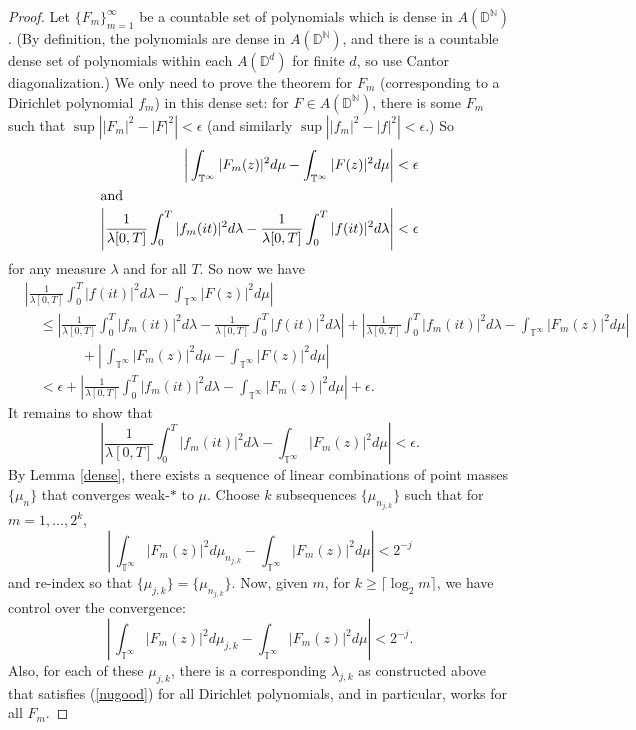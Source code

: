 \documentclass[]{elsarticle}
\newcommand{\N}{\mathbb{N}}
\newcommand{\T}{\mathbb{T}}
\newcommand{\D}{\mathbb{D}}
\numberwithin{equation}{section}
\begin{document}
    \begin{proof}
      Let $\{F_m\}_{m=1}^{\infty}$ be a countable set of polynomials which is dense in $A(\D^\N)$. (By definition, the polynomials are dense in $A(\D^\N)$, and there is a countable dense set of polynomials within each $A(\D^d)$ for finite $d$, so use Cantor diagonalization.) We only need to prove the theorem for $F_m$ (corresponding to a Dirichlet polynomial $f_m$) in this dense set: for $F\in A(\D^\N)$, there is some $F_m$ such that $\sup\left||F_m|^2-|F|^2\right|<\epsilon$ (and similarly $\sup\left||f_m|^2-|f|^2\right|<\epsilon$.) So 
      \begin{align*}
        \left|\,\int_{\T^{\infty}}|F_m(z)|^2d\mu -\int_{\T^{\infty}}|F(z)|^2d\mu \right| &< \epsilon\\
        \intertext{and}
        \left|\frac{1}{\lambda[0,T]}\int_{0}^{T}|f_m(it)|^2d\lambda - \frac{1}{\lambda[0,T]}\int_{0}^{T}|f(it)|^2d\lambda\right| &< \epsilon
      \end{align*}
      for any measure $\lambda$ and for all $T$. So now we have
      \begin{align*}
        &\left|\frac{1}{\lambda[0,T]}\int_{0}^{T}|f(it)|^2d\lambda -\int_{\T^{\infty}}|F(z)|^2d\mu\right|\\
          &\quad\leq \left|\frac{1}{\lambda[0,T]}\int_{0}^{T}|f_m(it)|^2d\lambda - \frac{1}{\lambda[0,T]}\int_{0}^{T}|f(it)|^2d\lambda\right| 
            +\left|\frac{1}{\lambda[0,T]}\int_{0}^{T}|f_m(it)|^2d\lambda - \int_{\T^{\infty}}|F_m(z)|^2d\mu\right|\\
            &\qquad \qquad+\left|\,\int_{\T^{\infty}}|F_m(z)|^2d\mu -\int_{\T^{\infty}}|F(z)|^2d\mu \right|\\
          &\quad< \epsilon +\left|\frac{1}{\lambda[0,T]}\int_{0}^{T}|f_m(it)|^2d\lambda - \int_{\T^{\infty}}|F_m(z)|^2d\mu\right| + \epsilon.
      \end{align*}
      It remains to show that 
      \begin{equation} \label{equalityforborel}
        \left|\frac{1}{\lambda[0,T]}\int_{0}^{T}|f_m(it)|^2d\lambda - \int_{\T^{\infty}}|F_m(z)|^2d\mu\right|<\epsilon.
      \end{equation} 
      By Lemma \ref{dense}, there exists a sequence of linear combinations of point masses $\{\mu_n\}$ that converges weak-$\ast$ to $\mu$. Choose $k$ subsequences $\{\mu_{n_{j,k}}\}$ such that for $m=1,\dots ,2^k$,
      \begin{equation*}
        \left|\,\int_{\T^{\infty}}|F_m(z)|^2d\mu_{n_{j,k}} -\int_{\T^{\infty}}|F_m(z)|^2d\mu\right|<2^{-j}
      \end{equation*}
      and re-index so that $\{\mu_{j,k}\}=\{\mu_{n_{j,k}}\}$. Now, given $m$, for $k\geq \lceil \log_2 m \rceil$, we have control over the convergence:
      \begin{equation}\label{goodmuseq}
        \left|\,\int_{\T^{\infty}}|F_m(z)|^2d\mu_{j,k} -\int_{\T^{\infty}}|F_m(z)|^2d\mu\right|<2^{-j}.
      \end{equation}
      Also, for each of these $\mu_{j,k}$, there is a corresponding $\lambda_{j,k}$ as constructed above that satisfies (\ref{nugood}) for all Dirichlet polynomials, and in particular, works for all $F_m$. 


\end{proof}
\end{document}
